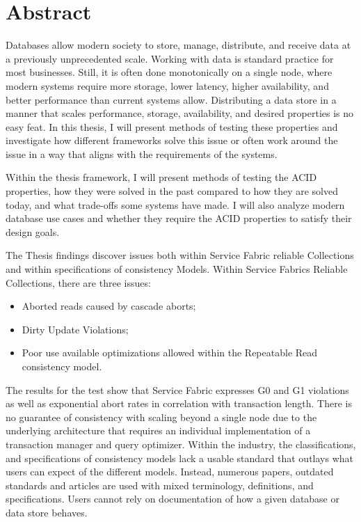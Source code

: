 \documentclass[a4paper,10pt,titlepage]{report}
\begin{document}
    \section*{Abstract}
    Databases allow modern society to store, manage, distribute, and receive data at a previously unprecedented scale. Working with data is standard practice for most businesses. Still, it is often done monotonically on a single node, where modern systems require more storage, lower latency, higher availability, and better performance than current systems allow. Distributing a data store in a manner that scales performance, storage, availability, and desired properties is no easy feat. In this thesis, I will present methods of testing these properties and investigate how different frameworks solve this issue or often work around the issue in a way that aligns with the requirements of the systems. \\
    \vspace{5mm}

    Within the thesis framework, I will present methods of testing the ACID properties, how they were solved in the past compared to how they are solved today, and what trade-offs some systems have made. I will also analyze modern database use cases and whether they require the ACID properties to satisfy their design goals.\\
    \vspace{5mm}


    The Thesis findings discover issues both within Service Fabric reliable Collections and within specifications of consistency Models. 
    Within Service Fabrics Reliable Collections, there are three issues: 
    \begin{itemize}
    \item Aborted reads caused by cascade aborts;
    \item Dirty Update Violations;
    \item Poor use available optimizations allowed within the Repeatable Read consistency model. 
    \end{itemize}
    
    The results for the test show that Service Fabric expresses G0 and G1 violations as well as exponential abort rates in correlation with transaction length. There is no guarantee of consistency with scaling beyond a single node due to the underlying architecture that requires an individual implementation of a transaction manager and query optimizer.
    Within the industry, the classifications, and specifications of consistency models lack a usable standard that outlays what users can expect of the different models.
    Instead, numerous papers, outdated standards and articles are used with mixed terminology, definitions, and specifications. Users cannot rely on documentation of how a given database or data store behaves.
\end{document}
